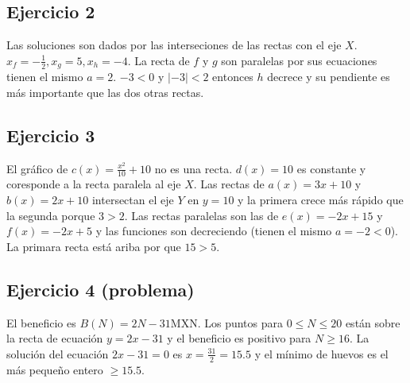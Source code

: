 \subsection*{Ejercicio 2}

Las soluciones son dados por las interseciones de las rectas con el eje $X$.
$x_f = -\frac{1}{2}, x_g = 5, x_h = -4$. La recta de $f$ y $g$ son paralelas
por sus ecuaciones tienen el mismo $a = 2$. $-3 < 0$ y ${|-3|} < 2$ entonces
$h$ decrece y su pendiente es más importante que las dos otras rectas.

\begin{center}
\end{center}

\subsection*{Ejercicio 3}

El gráfico de $c(x)=\frac{x^2}{10} + 10$ no es una recta.
$d(x) = 10$ es constante y coresponde a la recta paralela al eje $X$.
Las rectas de $a(x) = 3x+10$ y $b(x) = 2x+10$ intersectan el eje $Y$ en
$y = 10$ y la primera crece más rápido que la segunda porque $3 > 2$.
Las rectas paralelas son las de $e(x) = -2x+15$ y $f(x) = -2x+5$ y las
funciones son decreciendo (tienen el mismo $a=-2 < 0$). La primara recta está
ariba por que $15 > 5$.

\subsection*{Ejercicio 4 (problema)}

El beneficio es $B(N) = 2N - 31$MXN. Los puntos para $0 \leq N \leq 20$ están
sobre la recta de ecuación $y = 2x - 31$ y el beneficio es positivo para
$N \geq 16$. La solución del ecuación $2x - 31 = 0$ es
$x = \frac{31}{2} = 15.5$ y el mínimo de huevos es el más pequeño entero
$\geq 15.5$.

\begin{center}
\end{center}
